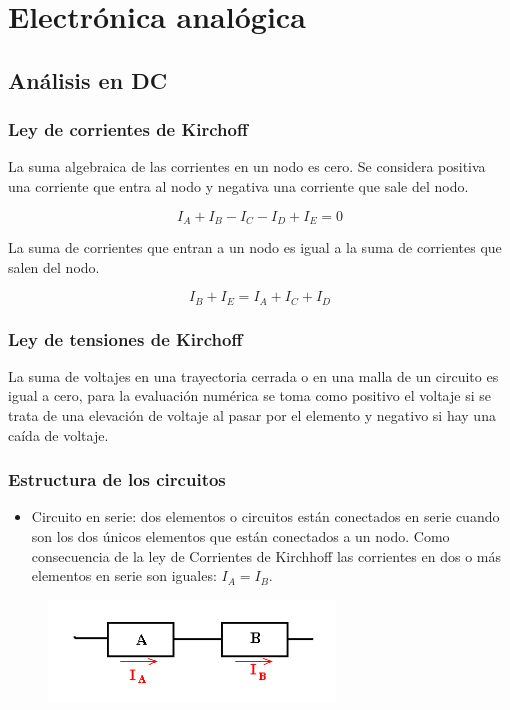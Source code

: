 \documentclass{beamer}
\begin{document}
\section{Electrónica analógica}

\subsection{Análisis en DC}

\begin{frame}
\frametitle{Ley de corrientes de Kirchoff}

La suma algebraica de las corrientes en un nodo es cero. Se considera positiva una corriente que entra al nodo y negativa una corriente que sale del nodo.

$$I_{A} + I_{B} - I_{C} - I_{D} + I_{E} = 0$$

La suma de corrientes que entran a un nodo es igual a la suma de corrientes que salen del nodo.

$$I_{B} + I_{E} = I_{A} + I_{C} + I_{D}$$

\end{frame}

\begin{frame}
\frametitle{Ley de tensiones de Kirchoff}

La suma de voltajes en una trayectoria cerrada o en una malla de un circuito es igual a cero, para la evaluación numérica se toma como positivo el voltaje si se trata de una elevación de voltaje al pasar por el elemento y negativo si hay una caída de voltaje.

\end{frame}



\begin{frame}
\frametitle{Estructura de los circuitos}

\begin{itemize}
\item Circuito en serie: dos elementos o circuitos están conectados en serie cuando son los dos únicos elementos que están conectados a un nodo. Como consecuencia de la ley de Corrientes de Kirchhoff las corrientes en dos o más elementos en serie son iguales: $I_{A} = I_{B}$.
\end{itemize}

\begin{figure}[!h]
\centering
\includegraphics[width=3in]{serie}
\end{figure}

\end{frame}
\end{document}
